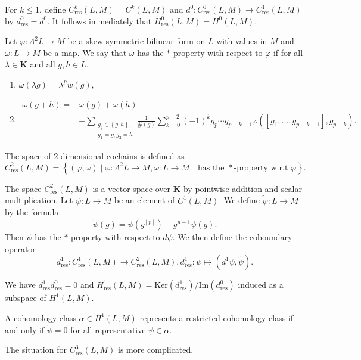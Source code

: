 \documentclass[11pt, twoside]{article}
\DeclareMathOperator{\g}{\mathfrak{g}}
\begin{document}
For $k\leq 1$, define $C_\mathrm{res}^k(L,M)=C^k(L,M)$ and $d^0: C_\mathrm{res}^0(L,M)\to C_\mathrm{res}^1(L,M) $ by $d_\mathrm{res}^0=d^0$. It follows immediately that $H_\mathrm{res}^0(L,M)=H^0(L,M) $. 

\begin{defi}\cite{E96}
    Let $\varphi:\Lambda^2L\to M $ be a skew-symmetric bilinear form on $L$ with values in $M$ and $\omega:L\to M$ be a map. We say that $\omega$ has the $\ast $-property with respect to $\varphi$ if for all $\lambda\in \mathbf{K}$ and all $g,h\in L$, \begin{enumerate}
    \item $\omega(\lambda g)=\lambda^pw(g)$,
    \item \begin{align*}
        \omega(g+h)= &\omega(g)+\omega(h) \\ & + \sum_{\substack{g_j\in \left\{g,h \right\},\\g_1=g,g_2=h}}\frac{1}{\#(g)}\sum\limits_{k=0}^{p-2}(-1)^kg_p\cdots g_{p-k+1}\varphi([g_1,\ldots,g_{p-k-1}],g_{p-k}).
    \end{align*} 
\end{enumerate} The space of $2$-dimensional cochains is  defined as $$C_\mathrm{res}^2(L,M)=\left\{(\varphi,\omega)\mid \varphi:\Lambda^2L\to M, \omega:L\to M \quad \text{has the $\ast$-property w.r.t $\varphi$} \right\}. $$
\end{defi}

The space $C_\mathrm{res}^2(L,M)$ is a vector space over $\mathbf{K} $ by pointwise addition and scalar multiplication. Let $\psi:L\to M $ be an element of $C^1(L,M) $. We define $\tilde{\psi}:L\to M $ by the formula $$\tilde{\psi}(g)= \psi(g^{[p]})- g^{p-1}\psi(g).$$ Then $\tilde{\psi} $ has the $\ast$-property with respect to $d\psi $. We then define the coboundary operator $$d_\mathrm{res}^1:C_\mathrm{res}^1(L,M)\to C_\mathrm{res}^2(L,M), d_\mathrm{res}^1:\psi\mapsto (d^1\psi,\tilde{\psi}). $$

 \begin{thm}\cite{E96}
 We have $d^1_\mathrm{res}d_\mathrm{res}^0=0 $ and $H_\mathrm{res}^1(L,M)=\mathrm{Ker}(d_\mathrm{res}^1)/\mathrm{Im}(d_\mathrm{res}^0) $ induced  as a subspace of $H^1(L,M) $.
 \end{thm}
 
A cohomology class $ \alpha\in H^1(L,M)$ represents a restricted cohomology class if and only if $\tilde{\psi}=0 $ for all representative $\psi\in \alpha$. 

The situation for $C_\mathrm{res}^3(L,M)$ is more complicated. 
\end{document}

